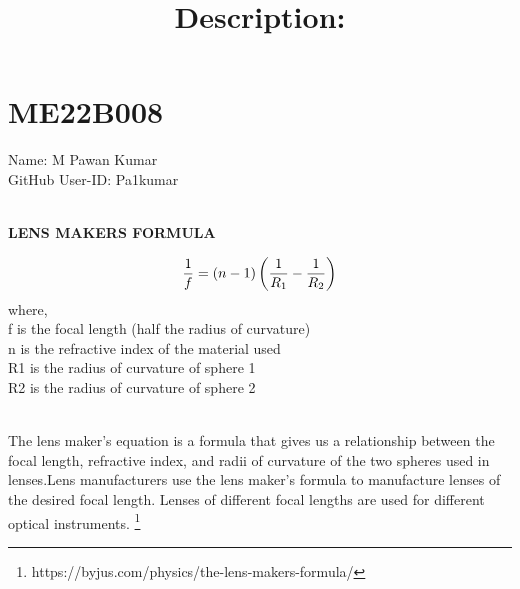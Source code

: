 \section{ME22B008}
Name: M Pawan Kumar \\ GitHub User-ID: Pa1kumar \\ 
\\ \begin{center}
    \textbf{LENS MAKERS FORMULA}
\end{center}
\begin{equation*}
    \huge\frac{1}{f}=(n-1)\left(\frac{1}{R_1}-\frac{1}{R_2}\right)
\end{equation*}
where,\\
f is the focal length (half the radius of curvature)\\
n is the refractive index of the material used\\
R1 is the radius of curvature of sphere 1\\
R2 is the radius of curvature of sphere 2 \\ 
\title{\textbf{Description:}} \\
The lens maker’s equation is a formula that gives us a relationship between the focal length, refractive index, and radii of curvature of the two spheres used in lenses.Lens manufacturers use the lens maker’s formula to manufacture lenses of the desired focal length. Lenses of different focal lengths are used for different optical instruments.   
\footnote{https://byjus.com/physics/the-lens-makers-formula/}
